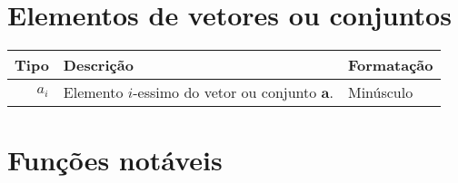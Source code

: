 \section*{Elementos de vetores ou conjuntos}
\begin{tabular}{r | p{.55\linewidth} | l}
\hline	
Tipo & Descrição & Formatação \\ \hline
$a_{i}$ & Elemento $i$-essimo do vetor ou conjunto  $\mathbf{a}$.& Minúsculo \\
\end{tabular}

\section*{Funções notáveis}
